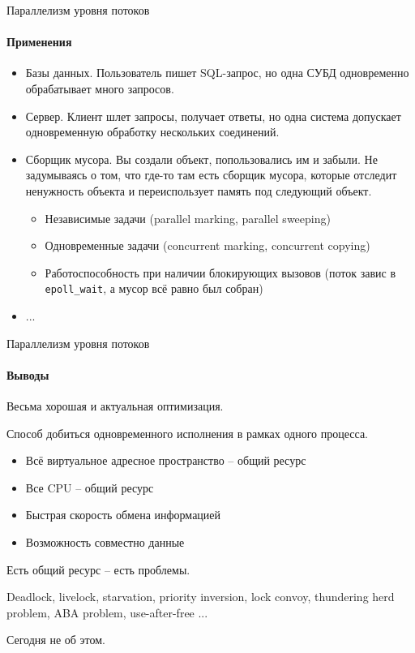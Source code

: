 \begin{frame}{Параллелизм уровня потоков}
\framesubtitle{Применения}

\begin{itemize}
 \item Базы данных. Пользователь пишет SQL-запрос, но одна СУБД одновременно обрабатывает много запросов. 
 \pause

 \item Сервер. Клиент шлет запросы, получает ответы, но одна система допускает одновременную обработку нескольких соединений.

\pause
 
 \item Сборщик мусора. Вы создали объект, попользовались им и забыли. Не задумываясь о том, что где-то там есть сборщик мусора, которые отследит ненужность объекта и переиспользует память под следующий объект.
 \pause
 
  \begin{itemize}
    \item Независимые задачи (parallel marking, parallel sweeping)
    \pause
 
    \item Одновременные задачи (concurrent marking, concurrent copying)
    \pause
 
    \item Работоспособность при наличии блокирующих вызовов (поток завис в \texttt{epoll\_wait}, а мусор всё равно был собран)
  \end{itemize}

\pause
 
 \item ...

\end{itemize}
 
\end{frame}


\begin{frame}{Параллелизм уровня потоков}
\framesubtitle{Выводы}

  Весьма хорошая и актуальная оптимизация.

  Способ добиться одновременного исполнения в рамках одного процесса.
  \begin{itemize}
    \item Всё виртуальное адресное пространство -- общий ресурс
    \item Все CPU -- общий ресурс
    \item Быстрая скорость обмена информацией
    \item Возможность совместно  данные
  \end{itemize}

  \pause
  Есть общий ресурс -- есть проблемы.

  Deadlock, livelock, starvation, priority inversion, lock convoy, thundering herd problem, ABA problem, use-after-free ...

  \pause
  Сегодня не об этом.

\end{frame}




